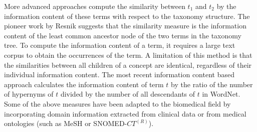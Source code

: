 More advanced approaches \cite{Resnik:1995, Jiang:1997, Lin:1998, Seco:2004, Snchez:2011} compute the similarity between $t_1$ and $t_2$ by the
information content of these terms with respect to the taxonomy structure. The pioneer work by Resnik \cite{Resnik:1995} suggests that the
similarity measure is the information content of the least common ancestor node of the two terms in the taxonomy tree.
To compute the information content of a term, it requires a large text corpus
to obtain the occurrences of the term.
A limitation of this method is that the similarities between all children of
a concept are identical, regardless of their individual information content.
The most recent information content based approach \cite{Snchez:2011} calculates
the information content of term $t$ by the ratio of
the number of hypernyms of $t$ divided by the number of all descendants of $t$ in WordNet. 
Some of the above measures have been adapted to the biomedical field by incorporating domain information extracted from clinical data or from medical ontologies (such as MeSH or SNOMED-$CT^{(R)}$)\cite{Pedersen:2007, Batet:2011}.
 

